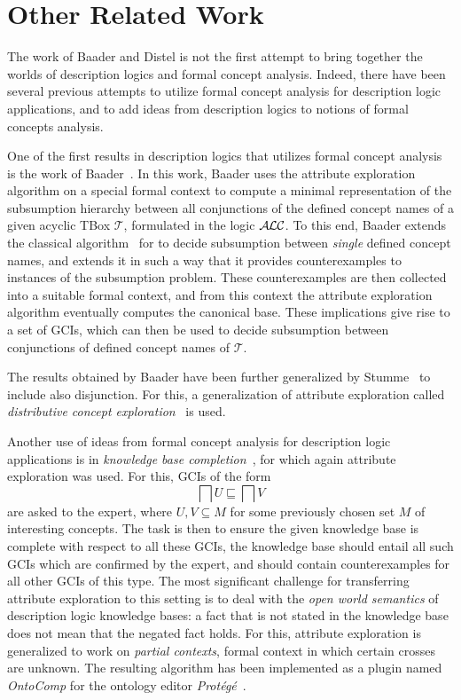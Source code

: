\section{Other Related Work}
\label{sec:related-work}

The work of Baader and Distel is not the first attempt to bring together the worlds of
description logics and formal concept analysis.  Indeed, there have been several previous
attempts to utilize formal concept analysis for description logic applications, and to add
ideas from description logics to notions of formal concepts analysis.

One of the first results in description logics that utilizes formal concept analysis is
the work of Baader~\cite{Baader-KRUSE-95}.  In this work, Baader uses the attribute
exploration algorithm on a special formal context to compute a minimal representation of
the subsumption hierarchy between all conjunctions of the defined concept names of a given
acyclic TBox $\mathcal{T}$, formulated in the logic $\mathcal{A}\kern-0.05em\mathcal{L}\mathcal{C}$.  To this end, Baader extends
the classical algorithm~\cite{journals/ai/Schmidt-SchaussS91} for \ALC to decide
subsumption between \emph{single} defined concept names, and extends it in such a way that
it provides counterexamples to instances of the subsumption problem.  These
counterexamples are then collected into a suitable formal context, and from this context
the attribute exploration algorithm eventually computes the canonical base.  These
implications give rise to a set of GCIs, which can then be used to decide subsumption
between conjunctions of defined concept names of $\mathcal{T}$.

The results obtained by Baader have been further generalized by
Stumme~\cite{stumme96concept} to include also disjunction.  For this, a generalization of
attribute exploration called \emph{distributive concept
  exploration}~\cite{conf/ki/Stumme98} is used.

Another use of ideas from formal concept analysis for description logic applications is in
\emph{knowledge base completion}~\cite{Sert07,conf/ijcai/BaaderGSS07}, for which again
attribute exploration was used.  For this, GCIs of the form
\begin{equation*}
  \bigsqcap U \sqsubseteq \bigsqcap V
\end{equation*}
are asked to the expert, where $U, V \subseteq M$ for some previously chosen set $M$ of
interesting concepts.  The task is then to ensure the given knowledge base is complete
with respect to all these GCIs, \ie the knowledge base should entail all such GCIs which
are confirmed by the expert, and should contain counterexamples for all other GCIs of this
type.  The most significant challenge for transferring attribute exploration to this
setting is to deal with the \emph{open world semantics} of description logic knowledge
bases: a fact that is not stated in the knowledge base does not mean that the negated fact
holds.  For this, attribute exploration is generalized to work on \emph{partial contexts},
\ie formal context in which certain crosses are unknown.  The resulting algorithm has been
implemented as a plugin named \emph{OntoComp} for the ontology editor
\emph{Protégé}~\cite{conf/esws/Sertkaya09}.

